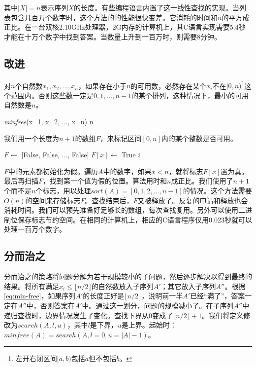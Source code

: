 \documentclass[b5paper, punct=kaiming]{ctexart}
\begin{document}
其中$|X| = n$表示序列$X$的长度。有些编程语言内置了这一线性查找的实现。当列表包含几百万个数字时，这个方法的的性能很快变差。它消耗的时间和$n$的平方成正比。在一台双核2.10GHz处理器，2G内存的计算机上，其C语言实现需要5.4秒才能在十万个数字中找到答案。当数量上升到一百万时，则需要8分钟。

\subsection*{改进}
对$n$个自然数$x_1, x_2, ..., x_n$，如果存在小于$n$的可用数，必然存在某个$x_i$不在$[0, n)$\footnote{左开右闭区间$[a, b)$包括$a$但不包括$b$。}这个范围内。否则这些数一定是$0, 1, ..., n - 1$的某个排列，这种情况下，最小的可用自然数是$n$。

\be
\textit{minfree}(x_1, x_2, ..., x_n) \leq n
\label{eq:min-free}
\ee

我们用一个长度为$n + 1$的数组$F$，来标记区间$[0, n]$内的某个整数是否可用。

\begin{algorithmic}[1]
  \State $F \gets$ [False, False, ..., False] 
      \State $F[x] \gets$ True
    \EndIf
  \EndFor
      \State \Return $i$
    \EndIf
  \EndFor
\EndFunction
\end{algorithmic}

$F$中的元素都初始化为假。遍历$A$中的数字，如果$x < n$，就将标志$F[x]$置为真。最后再扫描$F$，找到第一个值为假的位置。算法用时和$n$成正比。我们使用了$n + 1$个而不是$n$个标志，用以处理$sort(A) = [0, 1, 2, ..., n-1]$的情况。这个方法需要$O(n)$的空间来存储标志$F$。查找结束后，$F$又被释放了。反复的申请和释放也会消耗时间。我们可以预先准备好足够长的数组，每次查找复用。另外可以使用二进制位保存标志节约空间。在相同的计算机上，相应的C语言程序仅用0.023秒就可以处理一百万个数字。

\subsection*{分而治之}
分而治之的策略将问题分解为若干规模较小的子问题，然后逐步解决以得到最终的结果。将所有满足$x_i \leq \lfloor n/2 \rfloor$的自然数放入子序列$A'$；其它放入子序列$A''$。根据\cref{eq:min-free}，如果序列$A'$的长度正好是$\lfloor n/2 \rfloor$，说明前一半$A'$已经“满了”，答案一定在$A''$中，否则答案在$A'$中。通过这一划分，问题的规模减小了。在子序列$A''$中递归查找时，边界情况发生了变化。查找下界从0变成了$\lfloor n/2 \rfloor + 1$。我们将定义修改为$search(A, l, u)$，其中$l$是下界，$u$是上界。起始时：$minfree(A) = search(A, l = 0, u = |A|-1)$。
\end{document}
